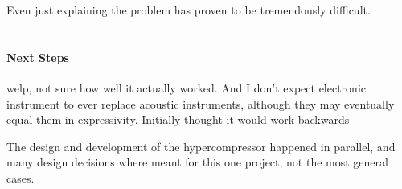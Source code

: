 Even just explaining the problem has proven to be tremendously
difficult. 

\section{\thesis}

\paragraph{Next Steps}
welp, not sure how well it actually
worked. And I don't expect electronic instrument to ever replace
acoustic instruments, although they may eventually equal them in
expressivity. Initially thought it would work backwards

The design and development of the hypercompressor happened in
parallel, and many design decisions where meant for this one project,
not the most general cases. 
